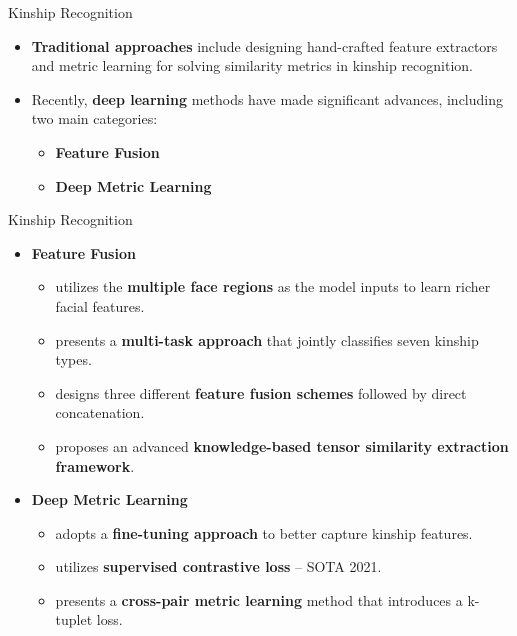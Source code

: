 \documentclass[aspectratio=169,xcolor=dvipsnames]{beamer}
\begin{document}
\begin{frame}{Kinship Recognition}
    \begin{itemize}
        \item \textbf{Traditional approaches} include designing hand-crafted feature extractors and metric learning for solving similarity metrics in kinship recognition.
        \pause
        \item Recently, \textbf{deep learning} methods have made significant advances, including two main categories:
        \pause
            \begin{itemize}
                \item \textbf{Feature Fusion}
                \item \textbf{Deep Metric Learning}
            \end{itemize}
    \end{itemize}
\end{frame}


\begin{frame}{Kinship Recognition}
    \begin{itemize}
        \item \textbf{Feature Fusion}
            \begin{itemize}
                \item \cite{R38} utilizes the \textbf{multiple face regions} as the model inputs to learn richer facial features.
                \item \cite{R5} presents a \textbf{multi-task approach} that jointly classifies seven kinship types.
                \item \cite{R36} designs three different \textbf{feature fusion schemes} followed by direct concatenation.
                \item \cite{R29} proposes an advanced \textbf{knowledge-based tensor similarity extraction framework}.
            \end{itemize}
        \pause
        \item \textbf{Deep Metric Learning}
            \begin{itemize}
                \item \cite{R11} adopts a \textbf{fine-tuning approach} to better capture kinship features.
                \item \cite{R40} utilizes \textbf{supervised contrastive loss} -- SOTA 2021.
                \item \cite{R15} presents a \textbf{cross-pair metric learning} method that introduces a k-tuplet loss.
            \end{itemize}
        \end{itemize}
\end{frame}
\end{document}
